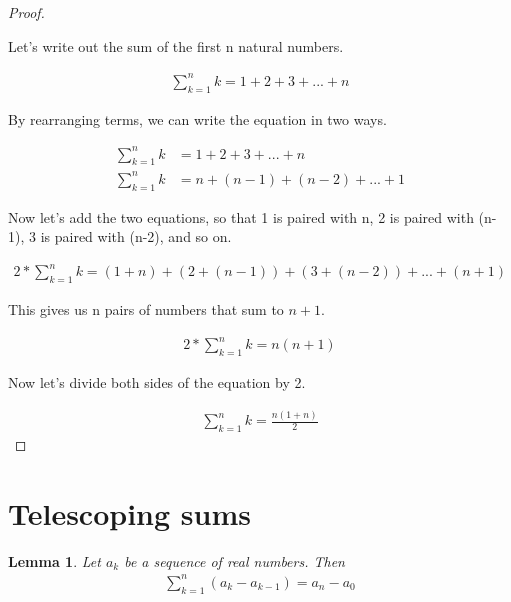 \documentclass{article}
\newtheorem{lemma}{Lemma}
\begin{document}
\begin{proof}
\begin{flushleft}
Let's write out the sum of the first n natural numbers.
\end{flushleft}

\begin{align*}
\sum_{k=1}^{n} k = 1 + 2 + 3 + ... + n
\end{align*}

\begin{flushleft}
By rearranging terms, we can write the equation in two ways.
\end{flushleft}

\begin{align*}
\sum_{k=1}^{n} k &= 1 + 2 + 3 + ... + n \\
\sum_{k=1}^{n} k &= n + (n-1) + (n-2) + ... + 1
\end{align*}

\begin{flushleft}
Now let's add the two equations, so that 1 is paired with n, 2 is paired with (n-1), 3 is paired with (n-2), and so on.
\end{flushleft}

\begin{align*}
2 * \sum_{k=1}^{n} k = (1 + n) + (2 + (n - 1)) + (3 + (n - 2)) + ... + (n + 1)
\end{align*}

\begin{flushleft}
This gives us n pairs of numbers that sum to $n+1$.
\end{flushleft}

\begin{align*}
2 * \sum_{k=1}^{n} k = n(n + 1)
\end{align*}

\begin{flushleft}
Now let's divide both sides of the equation by 2.
\end{flushleft}

\begin{align*}
\sum_{k=1}^{n} k = \frac{n(1 + n)}{2}
\end{align*}
\end{proof}
\section{Telescoping sums}

\begin{lemma}
Let $a_{k}$ be a sequence of real numbers. Then 
\begin{align*}
\sum_{k=1}^{n} (a_{k} - a_{k-1}) = a_{n} - a_{0}
\end{align*}
\end{lemma}
\end{document}
